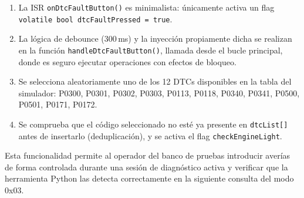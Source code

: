 \begin{enumerate}
    \item La ISR \texttt{onDtcFaultButton()} es minimalista: únicamente activa un flag \texttt{volatile bool dtcFaultPressed = true}.
    \item La lógica de debounce (300\,ms) y la inyección propiamente dicha se realizan en la función \texttt{handleDtcFaultButton()}, llamada desde el bucle principal, donde es seguro ejecutar operaciones con efectos de bloqueo.
    \item Se selecciona aleatoriamente uno de los 12 DTCs disponibles en la tabla del simulador: P0300, P0301, P0302, P0303, P0113, P0118, P0340, P0341, P0500, P0501, P0171, P0172.
    \item Se comprueba que el código seleccionado no esté ya presente en \texttt{dtcList[]} antes de insertarlo (deduplicación), y se activa el flag \texttt{checkEngineLight}.
\end{enumerate}

Esta funcionalidad permite al operador del banco de pruebas introducir averías de forma controlada durante una sesión de diagnóstico activa y verificar que la herramienta Python las detecta correctamente en la siguiente consulta del modo 0x03.
